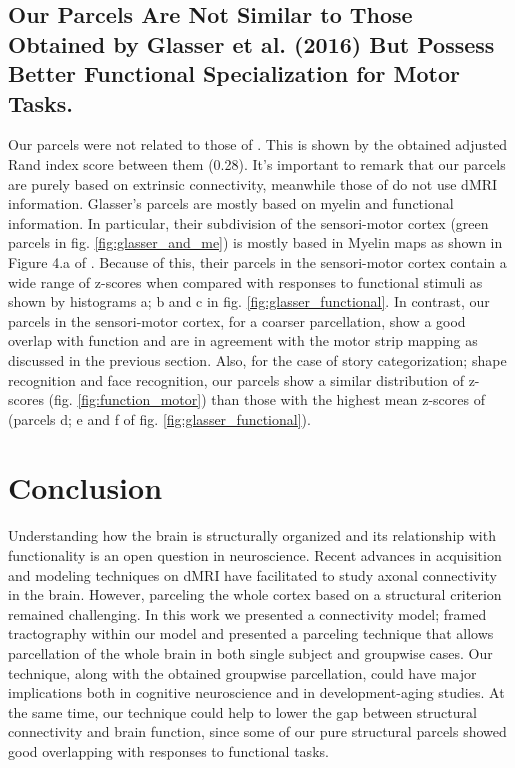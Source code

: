 \subsection{Our Parcels Are Not Similar to Those Obtained by Glasser et al. (2016) But 
			Possess Better Functional Specialization for Motor Tasks.}
Our parcels were not related to those of \citet{Glasser2016}. This is shown by the
obtained adjusted Rand index score between them (0.28). It's important to remark that
our parcels are purely based on extrinsic connectivity, meanwhile those of \citet{Glasser2016}
do not use dMRI information. Glasser's parcels are mostly based on myelin and functional information.
In particular, their subdivision of the sensori-motor cortex (green parcels in fig.
\ref{fig:glasser_and_me}) is mostly based in Myelin maps as shown in Figure 4.a of 
\citet{Glasser2016}. Because of this, their parcels in the sensori-motor cortex contain 
a wide range of z-scores when compared with responses to functional stimuli as shown by
histograms a; b and c in fig.
\ref{fig:glasser_functional}. In contrast, our parcels in the sensori-motor cortex,
for a coarser parcellation, show a good overlap with function and are in agreement with
the motor strip mapping as discussed in the previous section. Also, for the case of story
categorization; shape recognition and face recognition, our parcels show a similar
distribution of z-scores (fig. \ref{fig:function_motor}) than those with the highest 
mean z-scores of \citet{Glasser2016} (parcels d; e and f of  fig. \ref{fig:glasser_functional}).
%
\section{Conclusion}
%
Understanding how the brain is structurally organized and its relationship
with functionality is an open question in neuroscience. Recent advances in
acquisition and modeling techniques on dMRI have facilitated to study 
axonal connectivity in the brain. However, parceling the whole cortex based
on a structural criterion remained challenging. In this work we presented a 
connectivity model; framed tractography within our model and 
presented a parceling technique that allows parcellation
of the whole brain in both single subject and groupwise cases. Our
technique, along with the obtained groupwise parcellation, could have major
implications both in cognitive neuroscience and in development-aging studies.
At the same time, our technique could help to lower the gap between structural
connectivity and brain function, since some of our pure structural parcels showed
good overlapping with responses to functional tasks.

